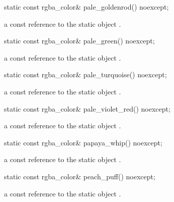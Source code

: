 \begin{itemdecl}
static const rgba_color& pale_goldenrod() noexcept;
\end{itemdecl}
\begin{itemdescr}
\pnum
\returns
a const reference to the static  object .
\end{itemdescr}

\begin{itemdecl}
static const rgba_color& pale_green() noexcept;
\end{itemdecl}
\begin{itemdescr}
\pnum
\returns
a const reference to the static  object .
\end{itemdescr}

\begin{itemdecl}
static const rgba_color& pale_turquoise() noexcept;
\end{itemdecl}
\begin{itemdescr}
\pnum
\returns
a const reference to the static  object .
\end{itemdescr}

\begin{itemdecl}
static const rgba_color& pale_violet_red() noexcept;
\end{itemdecl}
\begin{itemdescr}
\pnum
\returns
a const reference to the static  object .
\end{itemdescr}

\begin{itemdecl}
static const rgba_color& papaya_whip() noexcept;
\end{itemdecl}
\begin{itemdescr}
\pnum
\returns
a const reference to the static  object .
\end{itemdescr}

\begin{itemdecl}
static const rgba_color& peach_puff() noexcept;
\end{itemdecl}
\begin{itemdescr}
\pnum
\returns
a const reference to the static  object .
\end{itemdescr}


